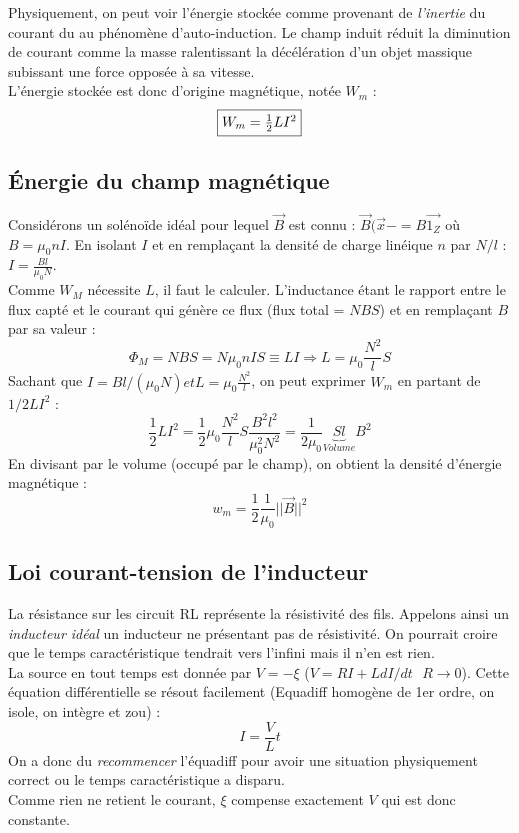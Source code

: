 \documentclass[british,french,11pt, a4paper, openany]{book}
\begin{document}
Physiquement, on peut voir l'énergie stockée comme provenant de \textit{l'inertie} du courant du au phénomène d'auto-induction. Le champ induit réduit la diminution de courant comme la masse ralentissant la décélération d'un objet massique subissant une force opposée à sa vitesse.\\
L'énergie stockée est donc d'origine magnétique, notée $W_m$ :
\begin{equation}
	\fbox{$W_m = \frac{1}{2}LI^2 $}
\end{equation}

\subsection{Énergie du champ magnétique}
Considérons un solénoïde idéal pour lequel $\vec{B}$ est connu : $\vec{B}(\vec{x}- = B\vec{1_Z}$ où $B = \mu_0nI$. En isolant $I$ et en remplaçant la densité de charge linéique $n$ par $N/l$ : $I = \frac{Bl}{\mu_0N}$.\\

Comme $W_M$ nécessite $L$, il faut le calculer. L'inductance étant le rapport entre le flux capté et le courant qui génère ce flux (flux total = $NBS$) et en remplaçant $B$ par sa valeur : 
\begin{equation}
	\Phi_M = NBS = N\mu_0nIS \equiv LI \Rightarrow L = \mu_0\frac{N^2}{l}S
\end{equation}
Sachant que $I = Bl / (\mu_0N) et L = \mu_0\frac{N^2}{l}$, on peut exprimer $W_m$ en partant de $1/2LI^2$ :
\begin{equation}
	\frac{1}{2}LI^2 = \frac{1}{2}\mu_0\frac{N^2}{l}S\frac{B^2l^2}{\mu_0^2N^2} = \frac{1}{2\mu_0}\underbrace{Sl}_{Volume}B^2
\end{equation}
En divisant par le volume (occupé par le champ), on obtient la densité d'énergie magnétique : 
\begin{equation}
	w_m = \frac{1}{2}\frac{1}{\mu_0}||\vec{B}||^2
\end{equation}

\subsection{Loi courant-tension de l'inducteur}
La résistance sur les circuit RL représente la résistivité des fils. Appelons ainsi un \textit{inducteur idéal} un inducteur ne présentant pas de résistivité. On pourrait croire que le temps caractéristique tendrait vers l'infini mais il n'en est rien.\\
La source en tout temps est donnée par $V = -\xi$ ($V = RI + L dI/dt \ \ \ R \rightarrow 0$). Cette équation différentielle se résout facilement (Equadiff homogène de 1er ordre, on isole, on intègre et zou) : 
\begin{equation}
	I = \frac{V}{L}t
\end{equation}
On a donc du \textit{recommencer} l'équadiff pour avoir une situation physiquement correct ou le temps caractéristique a disparu.\\
Comme rien ne retient le courant, $\xi$ compense exactement $V$ qui est donc constante.
\end{document}

